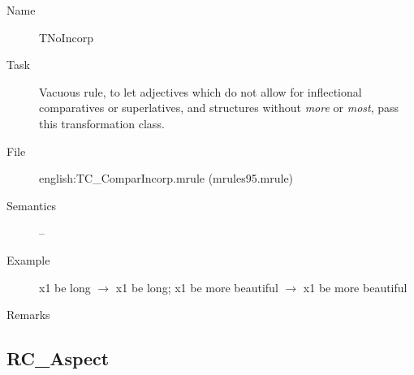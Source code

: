 \begin{description}
\vspace{1 cm}
\begin{description}
\item[Name] TNoIncorp
\item[Task] Vacuous rule, to let adjectives which do not allow for inflectional 
comparatives or superlatives, and structures without {\em more\/} or {\em 
most\/}, pass this transformation class.
\item[File] english:TC\_ComparIncorp.mrule (mrules95.mrule)
\item[Semantics] --
\item[Example] x1 be long $\rightarrow$ x1 be long; x1 be more beautiful 
$\rightarrow$ x1 be more beautiful
\item[Remarks] 
\end{description}

\end{description}


\newpage
\subsection{RC\_Aspect}

